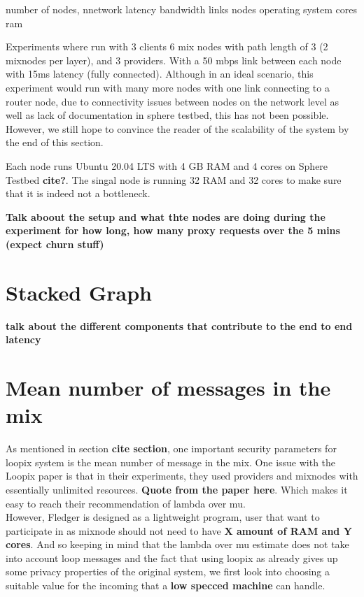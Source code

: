 \documentclass[a4paper,11pt,oneside]{report}
\begin{document}
number of nodes,
nnetwork latency bandwidth links
nodes operating system cores ram

Experiments where run with 3 clients 6 mix nodes with path length of 3 (2 mixnodes per layer), and 3 providers. With a 50 mbps link between each node with 15ms latency (fully connected). Although in an ideal scenario, this experiment would run with many more nodes with one link connecting to a router node, due to connectivity issues between nodes on the network level as well as lack of documentation in sphere testbed, this has not been possible. However, we still hope to convince the reader of the scalability of the system by the end of this section. 

Each node runs Ubuntu 20.04 LTS with 4 GB RAM and 4 cores on Sphere Testbed \textbf{cite?}. The singal node is running 32 RAM and 32 cores to make sure that it is indeed not a bottleneck.

\textbf{Talk aboout the setup and what thte nodes are doing during the experiment for how long, how many proxy requests over the 5 mins (expect churn stuff)}

\section{Stacked Graph}

\textbf{talk about the different components that contribute to the end to end latency}

\section{Mean number of messages in the mix}
As mentioned in section \textbf{cite section}, one important security parameters for loopix system is the mean number of message in the mix. One issue with the Loopix paper is that in their experiments, they used providers and mixnodes with essentially unlimited resources. \textbf{Quote from the paper here}. Which makes it easy to reach their recommendation of lambda over mu. \\
However, Fledger is designed as a lightweight program, user that want to participate in as mixnode should not need to have \textbf{X amount of RAM and Y cores}. And so keeping in mind that the lambda over mu estimate does not take into account loop messages and the fact that using loopix as already gives up some privacy properties of the original system, we first look into choosing a suitable value for the incoming that a \textbf{low specced machine} can handle.
\end{document}
